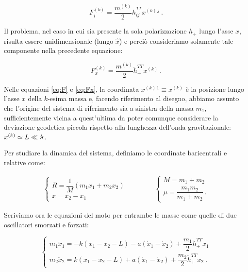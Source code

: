 \documentclass[a4paper,10pt]{article}
\newcommand{\lambdabar}{\lambda\mkern-9mu\raisebox{0.4ex}{–}}
\begin{document}
\begin{equation} \label{eq:F}
    F_i^{(k)} = \frac{m^{(k)}}{2} \ddot{h}_{ij}^{TT} x^{(k) \, j} \ .
\end{equation}

Il problema, nel caso in cui sia presente la sola polarizzazione $h_+$ lungo l'asse $x$, risulta essere unidimensionale (lungo $\hat x$) e perciò consideriamo solamente tale componente nella precedente equazione:

\begin{equation} \label{eq:Fx}
    F_x^{(k)} = \frac{m^{(k)}}{2} \ddot{h}_+^{TT} x^{(k)} \ .
\end{equation}

Nelle equazioni \eqref{eq:F} e \eqref{eq:Fx}, la coordinata $x^{(k) \, 1} \equiv x^{(k)}$ è la posizione lungo l'asse $x$ della $k$-esima massa e, facendo riferimento al disegno, abbiamo assunto che l'origine del sistema di riferimento sia a sinistra della massa $m_1$, sufficientemente vicina a quest'ultima da poter comunque considerare la deviazione geodetica piccola rispetto alla lunghezza dell'onda gravitazionale: $x^{(k)} \simeq L \ll \lambdabar$.

Per studiare la dinamica del sistema, definiamo le coordinate baricentrali e relative come:

\begin{equation} \label{eq:coor}
\begin{aligned}
    \begin{cases}
        R = \dfrac{1}{M}(m_1 x_1 + m_2 x_2) \\[2mm]
        x = x_2 - x_1
    \end{cases}
    \qquad \qquad
    \begin{cases}
        M = m_1 + m_2 \\[2mm]
        \mu = \dfrac{m_1 m_2}{m_1 + m_2} \ .
    \end{cases}
\end{aligned}
\end{equation}

Scriviamo ora le equazioni del moto per entrambe le masse come quelle di due oscillatori smorzati e forzati:

\begin{equation} \label{eq:osillatori}
    \begin{cases}
        m_1 \ddot x_1 = -k(x_1 - x_2 - L) - a(\dot x_1 - \dot x_2) + \dfrac{m_1}{2} \ddot{h}_+^{TT} x_1 \\[2mm]
        m_2 \ddot x_2 = k(x_1 - x_2 - L) + a(\dot x_1 - \dot x_2) + \dfrac{m_2}{2} \ddot{h}_+^{TT} x_2 \ .
    \end{cases}
\end{equation}
\end{document}
